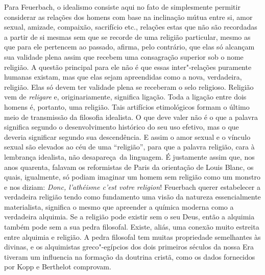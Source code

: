Para Feuerbach, o idealismo consiste aqui no fato de simplesmente
permitir considerar as relações dos homens com base na inclinação mútua
entre si, amor sexual, amizade, compaixão, sacrifício etc., relações
estas que não são recordadas a partir de si mesmas sem que se recorde de
uma religião particular, mesmo as que para ele pertencem ao passado,
afirma, pelo contrário, que elas só alcançam sua validade plena assim
que recebem uma consagração superior sob o nome religião. A questão
principal para ele não é que essas inter"-relações puramente humanas
existam, mas que elas sejam apreendidas como a nova, verdadeira,
religião. Elas só devem ter validade plena se receberam o selo
religioso. Religião vem
de \emph{religare} e, originariamente,
significa ligação. Toda a ligação entre dois homens é, portanto, uma
religião. Tais artifícios etimológicos formam o último meio de
transmissão da filosofia idealista. O que deve valer não é o que a
palavra significa segundo o desenvolvimento histórico do seu uso
efetivo, mas o que deveria significar segundo sua descendência. E assim
o amor sexual e o vínculo sexual são elevados ao céu de uma
``religião'', para que a palavra religião, cara à lembrança idealista,
não desapareça\est\ da linguagem. É justamente assim que, nos anos quarenta,
falavam os reformistas de Paris da orientação de Louis Blanc, os quais,
igualmente, só podiam imaginar um homem sem religião como um monstro e
nos diziam: \emph{Donc, l'athéisme c'est votre
religion}!
Feuerbach querer
estabelecer a verdadeira religião tendo como fundamento uma visão da
natureza essencialmente materialista, significa o mesmo que apreender a
química moderna como a verdadeira alquimia. Se a religião pode existir
sem o seu Deus, então a alquimia também pode sem a sua pedra filosofal.
Existe, aliás, uma conexão muito estreita entre alquimia e religião. A
pedra filosofal tem muitas propriedade semelhantes às divinas, e os
alquimistas greco"-egípcios dos dois primeiros séculos da nossa Era
tiveram um influencia na formação da doutrina cristã, como os dados
fornecidos por Kopp e Berthelot comprovam.

